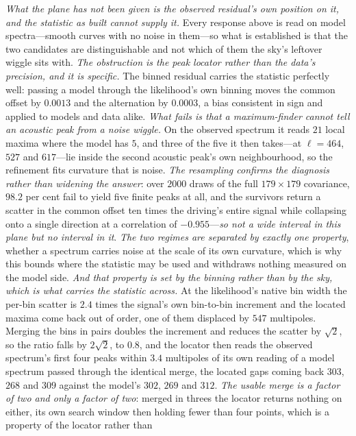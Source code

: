 \documentclass[11pt,a4paper]{article}
\theoremstyle{plain}
\theoremstyle{definition}
\theoremstyle{remark}
\begin{document}
\emph{What the plane has not been given is the observed residual's own position on it, and the
statistic as built cannot supply it.} Every response above is read on model spectra---smooth curves
with no noise in them---so what is established is that the two candidates are distinguishable and
not which of them the sky's leftover wiggle sits with. \emph{The obstruction is the peak locator
rather than the data's precision, and it is specific.} The binned residual carries the statistic
perfectly well: passing a model through the likelihood's own binning moves the common offset by
$0.0013$ and the alternation by $0.0003$, a bias consistent in sign and applied to models and data
alike. \emph{What fails is that a maximum-finder cannot tell an acoustic peak from a noise wiggle.}
On the observed spectrum it reads $21$ local maxima where the model has $5$, and three of the five
it then takes---at $\ell=464$, $527$ and $617$---lie inside the second acoustic peak's own
neighbourhood, so the refinement fits curvature that is noise. \emph{The resampling confirms the
diagnosis rather than widening the answer}: over $2000$ draws of the full $179\times179$ covariance,
$98.2$ per cent fail to yield five finite peaks at all, and the survivors return a scatter in the
common offset ten times the driving's entire signal while collapsing onto a single direction at a
correlation of $-0.955$---\emph{so not a wide interval in this plane but no interval in it}.
\emph{The two regimes are separated by exactly one property}, whether a spectrum carries noise at
the scale of its own curvature, which is why this bounds where the statistic may be used and
withdraws nothing measured on the model side. \emph{And that property is set by the binning rather
than by the sky, which is what carries the statistic across.} At the likelihood's native bin width the
per-bin scatter is $2.4$ times the signal's own bin-to-bin increment and the located maxima come back
out of order, one of them displaced by $547$ multipoles. Merging the bins in pairs doubles the
increment and reduces the scatter by $\sqrt{2}$, so the ratio falls by $2\sqrt{2}$, to $0.8$, and the
locator then reads the observed spectrum's first four peaks within $3.4$ multipoles
of its own reading of a model spectrum passed through the identical merge, the located gaps coming
back $303$, $268$ and $309$ against the model's $302$, $269$ and $312$. \emph{The usable merge is a
factor of two and only a factor of two}: merged in threes the locator returns nothing on either, its
own search window then holding fewer than four points, which is a property of the locator rather than
\end{document}
